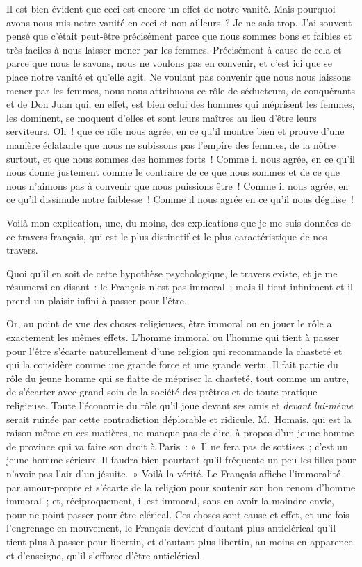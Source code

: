\documentclass[french,twoside]{book} %
\begin{document}
Il est bien évident que ceci est encore un effet de notre vanité. Mais pourquoi avons-nous mis notre vanité en ceci et non ailleurs ? Je ne sais trop. J’ai souvent pensé que c’était peut-être précisément parce que nous sommes bons et faibles et très faciles à nous laisser mener par les femmes. Précisément à cause de cela et parce que nous le savons, nous ne voulons pas en convenir, et c’est ici que se place notre vanité et qu’elle agit. Ne voulant pas convenir que nous nous laissons mener par les femmes, nous nous attribuons ce rôle de séducteurs, de conquérants et de Don Juan qui, en effet, est bien celui des hommes qui méprisent les femmes, les dominent, se moquent d’elles et sont leurs maîtres au lieu d’être leurs serviteurs. Oh ! que ce rôle nous agrée, en ce qu’il montre  bien et prouve d’une manière éclatante que nous ne subissons pas l’empire des femmes, de la nôtre surtout, et que nous sommes des hommes forts ! Comme il nous agrée, en ce qu’il nous donne justement comme le contraire de ce que nous sommes et de ce que nous n’aimons pas à convenir que nous puissions être ! Comme il nous agrée, en ce qu’il dissimule notre faiblesse ! Comme il nous agrée en ce qu’il nous déguise !\par
Voilà mon explication, une, du moins, des explications que je me suis données de ce travers français, qui est le plus distinctif et le plus caractéristique de nos travers.\par
Quoi qu’il en soit de cette hypothèse psychologique, le travers existe, et je me résumerai en disant : le Français n’est pas immoral ; mais il tient infiniment et il prend un plaisir infini à passer pour l’être.\par
Or, au point de vue des choses religieuses, être immoral ou en jouer le rôle a exactement les mêmes effets. L’homme immoral ou l’homme qui tient à passer pour l’être s’écarte naturellement d’une religion qui recommande la chasteté et qui la considère comme une grande force et une grande vertu. Il fait partie du rôle du jeune homme qui se flatte de mépriser la chasteté, tout comme un autre, de s’écarter avec grand soin de la société  des prêtres et de toute pratique religieuse. Toute l’économie du rôle qu’il joue devant ses amis et {\itshape devant lui-même} serait ruinée par cette contradiction déplorable et ridicule. M. Homais, qui est la raison même en ces matières, ne manque pas de dire, à propos d’un jeune homme de province qui va faire son droit à Paris : « Il ne fera pas de sottises ; c’est un jeune homme sérieux. Il faudra bien pourtant qu’il fréquente un peu les filles pour n’avoir pas l’air d’un jésuite. » Voilà la vérité. Le Français affiche l’immoralité par amour-propre et s’écarte de la religion pour soutenir son bon renom d’homme immoral ; et, réciproquement, il est immoral, sans en avoir la moindre envie, pour ne point passer pour être clérical. Ces choses sont cause et effet, et une fois l’engrenage en mouvement, le Français devient d’autant plus anticlérical qu’il tient plus à passer pour libertin, et d’autant plus libertin, au moins en apparence et d’enseigne, qu’il s’efforce d’être anticlérical.\par
\end{document}
